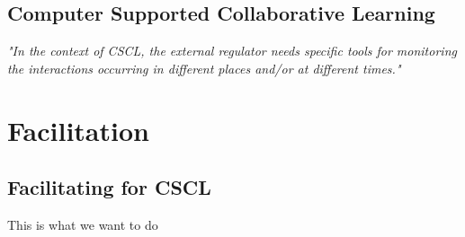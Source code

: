         \subsection{Computer Supported Collaborative Learning}
        \emph{"In the context of CSCL, the external regulator needs specific tools for monitoring the interactions occurring in different places and/or at different times."} \cite{dillenbourg1999}
    
    \section{Facilitation}
        \subsection{Facilitating for CSCL}
        This is what we want to do